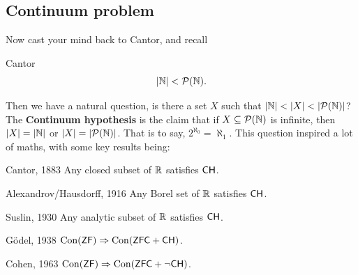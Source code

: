 \documentclass{article}
\begin{document}
\subsection{Continuum problem}
Now cast your mind back to Cantor, and recall \begin{fancythm*}{Cantor}
    \[|\mathbb{N}| < \mathcal{P}(\mathbb{N}).\]
\end{fancythm*}
Then we have a natural question, is there a set $X$ such that $|\mathbb{N}| < |X| < |\mathcal{P}(\mathbb{N})|$?
The \textbf{Continuum hypothesis} is the claim that if $X \subseteq \mathcal{P}(\mathbb{N})$ is infinite, then $|X| = |\mathbb{N}|$ or $|X| = |\mathcal{P}(\mathbb{N})|$. That is to say, $2^{\aleph_{0}} = \aleph_{1}$. This question inspired a lot of maths, with some key results being:
\begin{fancythm*}{Cantor, 1883}
    Any closed subset of $\mathbb{R}$ satisfies $\mathsf{CH}$.
\end{fancythm*}
\begin{fancythm*}{Alexandrov/Hausdorff, 1916}
    Any Borel set of $\mathbb{R}$ satisfies $\mathsf{CH}$.
\end{fancythm*}
\begin{fancythm*}{Suslin, 1930}
    Any analytic subset of $\mathbb{R}$ satisfies $\mathsf{CH}$.
\end{fancythm*}
\begin{fancythm*}{G\"odel, 1938}
    $\operatorname{Con}(\mathsf{ZF}) \Rightarrow \operatorname{Con}(\mathsf{ZFC} + \mathsf{CH})$.
\end{fancythm*}
\begin{fancythm*}{Cohen, 1963}
    $\operatorname{Con}(\mathsf{ZF}) \Rightarrow \operatorname{Con}(\mathsf{ZFC} + \neg \mathsf{CH})$.
\end{fancythm*}
\end{document}
